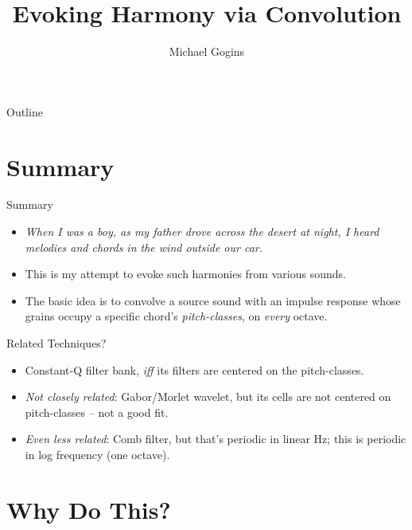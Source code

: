 \documentclass{beamer}
\title[Evoking Harmony] %
{Evoking Harmony via Convolution}
\author[Gogins] %
{Michael Gogins\inst{1}}
\institute %
{
	\inst{1}Irreducible Productions, New York\\
	\url{http://michaelgogins.tumblr.com}
}
\date
\begin{document}
\lstset{basicstyle=\ttfamily\tiny,commentstyle=\ttfamily\tiny,
  tabsize=2,breaklines,showstringspaces=false}

\begin{frame}
  \titlepage
\end{frame}

\begin{frame}{Outline}
  \tableofcontents
\end{frame}

\section{Summary}

\begin{frame}{Summary}
  \begin{itemize}
	\item
		\emph{When I was a boy, as my father drove across the desert at night, I
		heard melodies and chords in the wind outside our car.}
	\item
		This is my attempt to evoke such harmonies from various sounds.
	\item
		The basic idea is to convolve a source sound with an impulse response
		whose grains occupy a specific chord's \emph{pitch-classes}, on
		\emph{every} octave.
	\end{itemize}
\end{frame}

\begin{frame}{Related Techniques?}
  \begin{itemize}
	\item
		Constant-Q filter bank, \emph{iff} its filters are centered on the
		pitch-classes.
	\item
	\emph{Not closely related}: Gabor/Morlet wavelet, but its cells are not
	centered on pitch-classes -- not a good fit.
	\item \emph{Even less related}: Comb filter, but that's periodic in linear
	Hz; this is periodic in log frequency (one octave).
\end{itemize}
\end{frame}

\section{Why Do This?}
\end{document}
